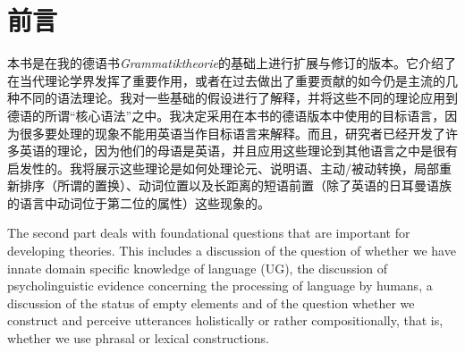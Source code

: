 \chapter{前言}

本书是在我的德语书\emph{Grammatiktheorie}\citep{MuellerGTBuch2}的基础上进行扩展与修订的版本。它介绍了在当代理论学界发挥了重要作用，或者在过去做出了重要贡献的如今仍是主流的几种不同的语法理论。我对一些基础的假设进行了解释，并将这些不同的理论应用到德语的所谓“核心语法”之中。我决定采用在本书的德语版本中使用的目标语言，因为很多要处理的现象不能用英语当作目标语言来解释。而且，研究者已经开发了许多英语的理论，因为他们的母语是英语，并且应用这些理论到其他语言之中是很有启发性的。我将展示这些理论是如何处理论元、说明语、主动/被动转换，局部重新排序（所谓的置换）、动词位置以及长距离的短语前置（除了英语的日耳曼语族的语言中动词位于第二位的属性）这些现象的。

The second part deals with foundational questions that are important for developing theories.
This includes a discussion of the question of whether we have innate domain specific knowledge of
language (UG), the discussion of psycholinguistic evidence concerning the processing of language by
humans, a discussion of the status of empty elements and of the question whether we construct and perceive utterances 
holistically or rather compositionally, that is, whether we use phrasal or lexical constructions.

